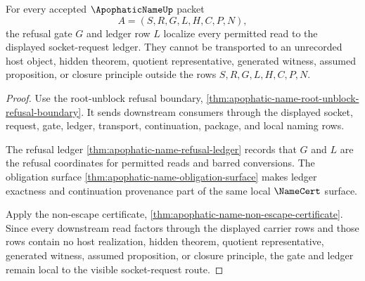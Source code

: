 \begin{theorem}
\label{thm:apophatic-name-refusal-gate-route-locality}
For every accepted $\ApophaticNameUp$ packet
$$
A=(S,R,G,L,H,C,P,N),
$$
the refusal gate $G$ and ledger row $L$ localize every permitted read to the displayed socket-request ledger. They cannot be transported to an unrecorded host object, hidden theorem, quotient representative, generated witness, assumed proposition, or closure principle outside the rows $S,R,G,L,H,C,P,N$.
\end{theorem}
\begin{proof}
Use the root-unblock refusal boundary, \autoref{thm:apophatic-name-root-unblock-refusal-boundary}. It sends downstream consumers through the displayed socket, request, gate, ledger, transport, continuation, package, and local naming rows.

The refusal ledger \autoref{thm:apophatic-name-refusal-ledger} records that $G$ and $L$ are the refusal coordinates for permitted reads and barred conversions. The obligation surface \autoref{thm:apophatic-name-obligation-surface} makes ledger exactness and continuation provenance part of the same local $\NameCert$ surface.

Apply the non-escape certificate, \autoref{thm:apophatic-name-non-escape-certificate}. Since every downstream read factors through the displayed carrier rows and those rows contain no host realization, hidden theorem, quotient representative, generated witness, assumed proposition, or closure principle, the gate and ledger remain local to the visible socket-request route.
\end{proof}

